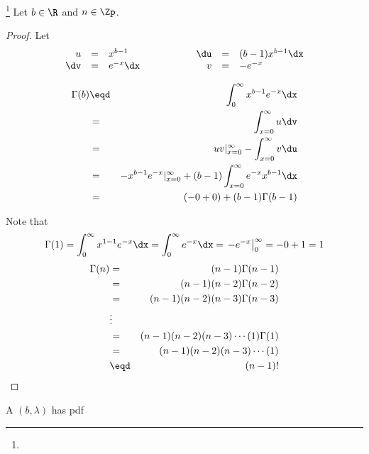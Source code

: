 \begin{proposition}
\footnote{
  }
Let $b\in\R$ and $n\in\Zp$.
\end{proposition}
\begin{proof}
Let
\[\begin{array}{rcl@{\hspace{2cm}}rcl}
  u   &=& x^{b-1}   & \du &=& (b-1)x^{b-1} \dx \\
  \dv &=& e^{-x}\dx & v   &=& -e^{-x}
\end{array}\]

\begin{eqnarray*}
  \Gamma(b)
    &\eqd& \int_0^\infty x^{b-1} e^{-x} \dx
  \\&=&    \int_{x=0}^\infty u \dv
  \\&=&    uv|_{x=0}^\infty - \int_{x=0}^\infty v \du
  \\&=&    -x^{b-1} e^{-x}|_{x=0}^\infty + (b-1)\int_{x=0}^\infty e^{-x} x^{b-1}\dx
  \\&=&    (-0+0) + (b-1)\Gamma(b-1)
\end{eqnarray*}

Note that
  \[ \Gamma(1)
       = \int_0^\infty x^{1-1} e^{-x} \dx
       = \int_0^\infty e^{-x} \dx
       = \left. -e^{-x} \right|_0^\infty
       = -0 + 1
       = 1
  \]
\begin{eqnarray*}
  \Gamma(n)
    &=& (n-1)\Gamma(n-1)
  \\&=& (n-1)(n-2)\Gamma(n-2)
  \\&=& (n-1)(n-2)(n-3)\Gamma(n-3)
  \\&\vdots&
  \\&=& (n-1)(n-2)(n-3)\cdots(1)\Gamma(1)
  \\&=& (n-1)(n-2)(n-3)\cdots(1)
  \\&\eqd& (n-1)!
\end{eqnarray*}
\end{proof}

\begin{definition}
A  $(b,\lambda)$ has pdf
\end{definition}

